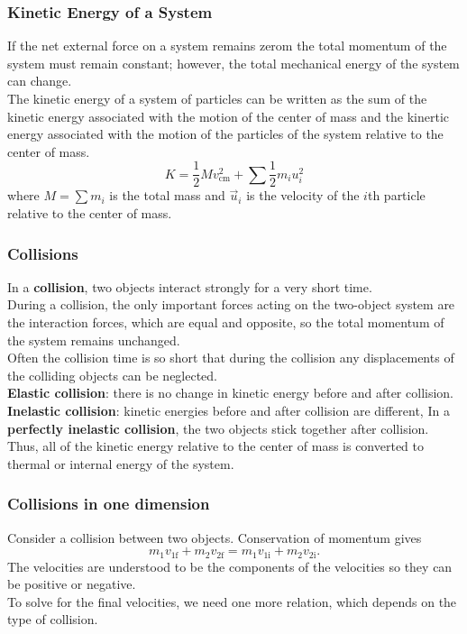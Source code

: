 \documentclass{beamer}
\begin{document}
\begin{frame}
\frametitle{Kinetic Energy of a System}
If the net external force on a system remains zerom the total momentum of the system must remain constant; however, the total mechanical energy of the system can change.
\\The kinetic energy of a system of particles can be written as the sum of the kinetic energy associated with the motion of the center of mass and the kinertic energy associated with the motion of the particles of the system relative to the center of mass.
$$K = \frac{1}{2} M v_\mathrm{cm}^2 + \sum \frac{1}{2} m_i u_i^2$$ where $M = \sum{m_i}$ is the total mass and $\vec{u}_i$ is the velocity of the $i$th particle relative to the center of mass.
\end{frame}

\begin{frame}
\frametitle{Collisions}
In a \textbf{collision}, two objects interact strongly for a very short time.
\\During a collision, the only important forces acting on the two-object system are the interaction forces, which are equal and opposite, so the total momentum of the system remains unchanged.
\\Often the collision time is so short that during the collision any displacements of the colliding objects can be neglected.
\\\textbf{Elastic collision}: there is no change in kinetic energy before and after collision.
\\\textbf{Inelastic collision}: kinetic energies before and after collision are different, In a \textbf{perfectly inelastic collision}, the two objects stick together after collision. Thus, all of the kinetic energy relative to the center of mass is converted to thermal or internal energy of the system.
\end{frame}

\begin{frame}
\frametitle{Collisions in one dimension}
Consider a collision between two objects. Conservation of momentum gives $$m_1 v_{1\mathrm{f}} + m_2 v_{2\mathrm{f}} = m_1 v_{1\mathrm{i}} + m_2 v_{2\mathrm{i}}.$$
The velocities are understood to be the components of the velocities so they can be positive or negative.
\\To solve for the final velocities, we need one more relation, which depends on the type of collision.
\end{frame}
\end{document}
